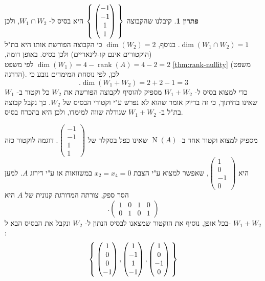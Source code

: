 \documentclass[12pt]{report}
\theoremstyle{plain}
\theoremstyle{definition}
\newtheorem*{solution}{פתרון}
\DeclareMathOperator{\rank}{rank}
\newcommand{\0}{\mathbf{0}}
\DeclareMathOperator{\Null}{N}
\begin{document}
\begin{solution}
קיבלנו שהקבוצה 
$\Set{\begin{pmatrix}-1 \\ -1 \\ 1 \\ 1\end{pmatrix}}$
היא בסיס ל-
$W_1\cap W_2$,
ולכן
$\dim(W_1\cap W_2)=1$. 
בנוסף,
$\dim(W_2)=2$
כי הקבוצה הפורשת אותו היא בת"ל (הוקטורים אינם קו-לינאריים) ולכן בסיס. באופן דומה,
$\dim(W_1)=4-\rank(A)=4-2=2$
לפי משפט
\ref{thm:rank-nullity}
(משפט הדרגה).
לכן, לפי נוסחת המימדים נובע כי
$$
.\dim(W_1+W_2)=2+2-1=3
$$
כדי למצוא בסיס ל-
$W_1+W_2$
מספיק להוסיף לקבוצה הפורשת את
$W_2$
כל וקטור ב-
$W_1$
שאינו בחיתוך, כי זה בדיוק אומר שהוא לא נפרש ע"י וקטורי הבסיס של 
$W_2$. 
כך נקבל קבוצה בת"ל ב-
$W_1+W_2$
שגודלה שווה למימדו, ולכן היא בהכרח בסיס.

מספיק למצוא וקטור אחד ב-
$\Null(A)$
שאינו כפל בסקלר של
$\begin{pmatrix}-1 \\ -1 \\ 1 \\ 1\end{pmatrix}$.
דוגמה לוקטור כזה היא 
$\begin{pmatrix}1 \\ 0 \\ -1 \\ 0\end{pmatrix}$,
שאפשר למצוא ע"י הצבת
$x_2=x_4=0$
במשוואות או ע"י דירוג 
$A$.
למען הסר ספק, צורתה המדורגת קנונית של 
$A$
היא
$$
.\begin{pmatrix}
1 & 0 & 1 & 0 \\
0 & 1 & 0 & 1
\end{pmatrix}
$$
בכל אופן, נוסיף את הוקטור שמצאנו לבסיס הנתון ל-
$W_2$
ונקבל את הבסיס הבא ל-
$W_1+W_2$:
$$
\Set{\begin{pmatrix}1\\0\\0\\-1\end{pmatrix},\begin{pmatrix}1\\-1\\1\\-1\end{pmatrix},\begin{pmatrix}1 \\ 0 \\ -1 \\ 0\end{pmatrix}}
$$

\end{solution}
\end{document}
